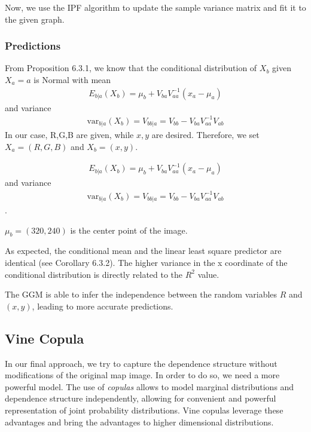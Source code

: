 \documentclass{article}
\begin{document}
Now, we use the IPF algorithm to update the sample variance matrix and
fit it to the given graph.


\subsubsection{Predictions}


From Proposition 6.3.1, we know that the conditional distribution of
$X_b$ given $X_a = a$ is Normal with mean
\begin{align}
  E_{b | a}(X_b) = \mu_b + V_{ba}V^{-1}_{aa}(x_a - \mu_a)
\end{align}
and variance
\begin{align}
  \text{var}_{b|a}(X_b) = V_{bb|a} = V_{bb} - V_{ba}V_{aa}^{-1}V_{ab}
\end{align}
In our case, R,G,B are given, while $x,y$ are
desired. Therefore, we set $X_a = (R, G, B)$ and $X_b = (x,y)$.

\begin{align}
  E_{b | a}(X_b) = \mu_b + V_{ba}V^{-1}_{aa}(x_a - \mu_a)
\end{align}
and variance
\begin{align}
  \text{var}_{b|a}(X_b) = V_{bb|a} = V_{bb} - V_{ba}V_{aa}^{-1}V_{ab}
\end{align}. 


$\mu_b = (320, 240)$ is the center point of the image.

As expected, the conditional mean and the linear least square
predictor are identical (see Corollary 6.3.2). The higher variance in
the x coordinate of the conditional distribution is directly related
to the $R^2$ value.

The GGM is able to infer the independence between the random variables
$R$ and $(x, y)$, leading to more accurate predictions.

\subsection{Vine Copula}

In our final approach, we try to capture the dependence structure
without modifications of the original map image. In order to do so, we
need a more powerful model. The use of \emph{copulas} allows to model
marginal distributions and dependence structure independently,
allowing for convenient and powerful representation of joint
probability distributions. Vine copulas leverage these advantages and
bring the advantages to higher dimensional distributions.
\end{document}
